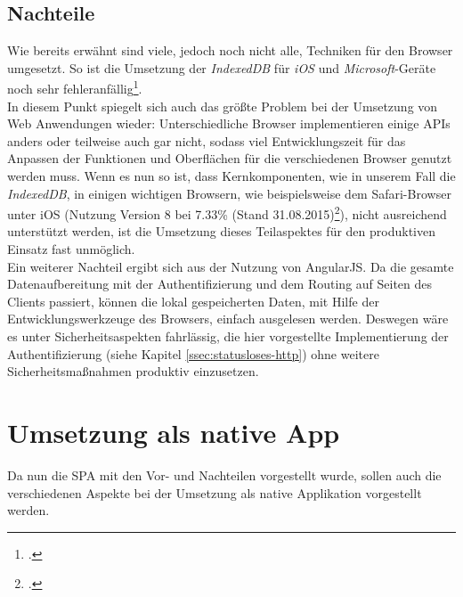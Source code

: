 \subsection{Nachteile}
\label{sec:nachteile-SPA}
Wie bereits erwähnt sind viele, jedoch noch nicht alle, Techniken für den Browser umgesetzt. So ist die Umsetzung der \textit{IndexedDB} für \textit{iOS} und \textit{Microsoft}-Geräte noch sehr fehleranfällig\footcite{online:caniuse:indexedDB}. \\
In diesem Punkt spiegelt sich auch das größte Problem bei der Umsetzung von Web Anwendungen wieder: Unterschiedliche Browser implementieren einige \ac{API}s anders oder teilweise auch gar nicht, sodass viel Entwicklungszeit für das Anpassen der Funktionen und Oberflächen für die verschiedenen Browser genutzt werden muss. Wenn es nun so ist, dass Kernkomponenten, wie in unserem Fall die \textit{IndexedDB}, in einigen wichtigen Browsern, wie beispielsweise dem Safari-Browser unter \gls{iOS} (Nutzung Version 8 bei 7.33\% (Stand 31.08.2015)\footcite{online:caniuse:indexedDB}), nicht ausreichend unterstützt werden, ist die Umsetzung dieses Teilaspektes für den produktiven Einsatz fast unmöglich. \\
Ein weiterer Nachteil ergibt sich aus der Nutzung von AngularJS. Da die gesamte Datenaufbereitung mit der Authentifizierung und dem Routing auf Seiten des Clients passiert, können die lokal gespeicherten Daten, mit Hilfe der Entwicklungswerkzeuge des Browsers, einfach ausgelesen werden. Deswegen wäre es unter Sicherheitsaspekten fahrlässig, die hier vorgestellte Implementierung der Authentifizierung (siehe Kapitel \ref{ssec:statusloses-http}) ohne weitere Sicherheitsmaßnahmen produktiv einzusetzen.

\section{Umsetzung als native App}
\label{sec:gegenueberstellung-native-app}
Da nun die \ac{SPA} mit den Vor- und Nachteilen vorgestellt wurde, sollen auch die verschiedenen Aspekte bei der Umsetzung als native Applikation vorgestellt werden. 

